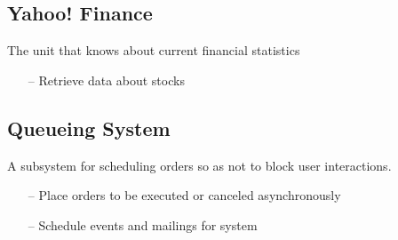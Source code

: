 \subsection{Yahoo! Finance}
The unit that knows about current financial statistics
\begin{itemize}
\item[--] Retrieve data about stocks
\end{itemize}
\subsection{Queueing System}
A subsystem for scheduling orders so as not to block user
interactions.
\begin{itemize}
\item[--] Place orders to be executed or canceled asynchronously
\item[--] Schedule events and mailings for system
\end{itemize}
